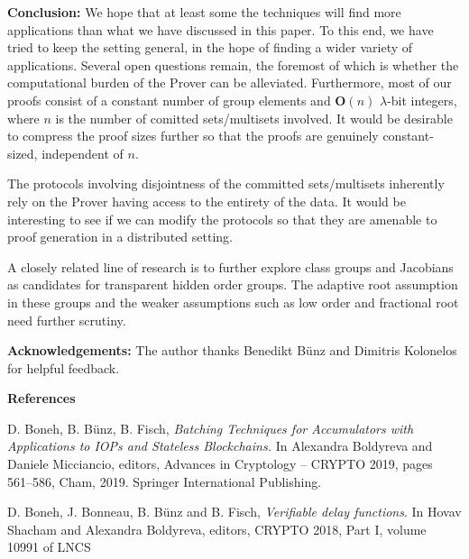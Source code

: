 \documentclass[11pt, lettersize, notitlepage, leqno, footskip=0.6cm]{article}
\newcommand{\mbf}{\mathbf}
\newcommand{\lam}{\lambda}
\newcommand{\bO}{\mbf{O}}
\newcommand{\noin}{\noindent}
\numberwithin{equation}{section}
\begin{document}
\bigskip

\noin \textbf{Conclusion:} We hope that at least some the techniques will find more applications than what we have discussed in this paper. To this end, we have tried to keep the setting general, in the hope of finding a wider variety of applications.  Several open questions remain, the foremost of which is whether the computational burden of the Prover can be alleviated. Furthermore, most of our proofs consist of a constant number of group elements and $\bO(n)$ $\lam$-bit integers, where $n$ is the number of comitted sets/multisets involved. It would be desirable to compress the proof sizes further so that the proofs are genuinely constant-sized, independent of $n$. 

The protocols involving disjointness of the committed sets/multisets inherently rely on the Prover having access to the entirety of the data. It would be interesting to see if we can modify the protocols so that they are amenable to proof generation in a distributed setting.

A closely related line of research is to further explore class groups and Jacobians as candidates for transparent hidden order groups. The adaptive root assumption in these groups and the weaker assumptions such as low order and fractional root need further scrutiny.




\bigskip

\noin \textbf{Acknowledgements:} The author thanks Benedikt B\"{u}nz and Dimitris Kolonelos for helpful feedback.

\bigskip



\begin{center}\textbf{References} \end{center}
\footnotesize

\noindent [BBF19] D. Boneh, B. B\"{u}nz, B. Fisch, \textit{Batching Techniques for Accumulators with Applications to IOPs and Stateless Blockchains.} In Alexandra Boldyreva and Daniele Micciancio, editors, Advances in Cryptology – CRYPTO 2019, pages 561–586, Cham, 2019. Springer International Publishing. \vspace{0.1cm}

\noin [BBBF18] D. Boneh, J. Bonneau, B. B\"{u}nz and B. Fisch, \textit{Verifiable delay functions}. In Hovav Shacham and Alexandra Boldyreva, editors, CRYPTO 2018, Part I, volume 10991 of LNCS \vspace{0.1cm}
\end{document}
